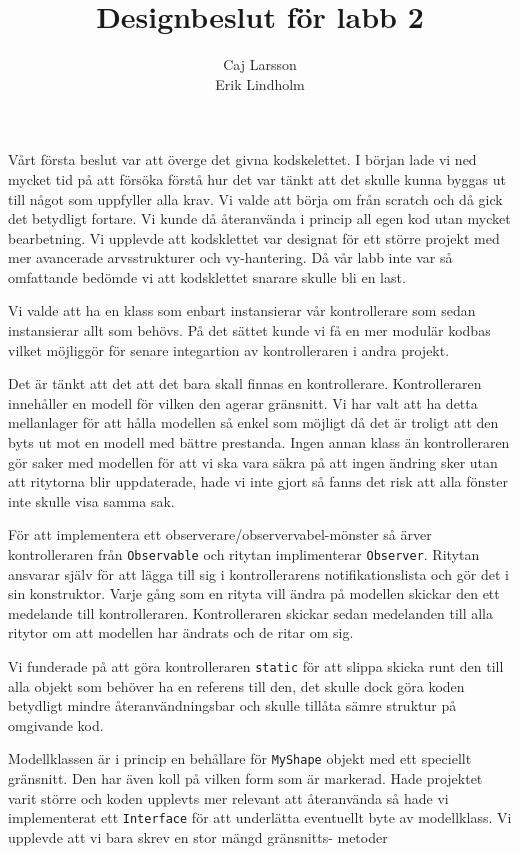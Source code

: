 \documentclass[a4paper,8pt]{article}
\begin{document}
\title{Designbeslut för labb 2}
\author{Caj Larsson\\Erik Lindholm}\maketitle

Vårt första beslut var att överge det givna kodskelettet. I början lade vi ned
mycket tid på att försöka förstå hur det var tänkt att det skulle kunna byggas
ut till något som uppfyller alla krav. Vi valde att börja om från scratch och då
gick det betydligt fortare. Vi kunde då återanvända i princip all egen kod 
utan mycket bearbetning. Vi upplevde att kodsklettet  var designat för ett 
större projekt med mer avancerade arvsstrukturer och vy-hantering. Då vår labb 
inte var så omfattande bedömde vi att kodsklettet snarare skulle bli en last.

Vi valde att ha en klass som enbart instansierar vår kontrollerare som sedan
instansierar allt som behövs. På det sättet kunde vi få en mer modulär kodbas
vilket möjliggör för senare integartion av kontrolleraren i andra projekt.

Det är tänkt att det att det bara skall finnas en kontrollerare. Kontrolleraren
innehåller en modell för vilken den agerar gränsnitt. Vi har valt att ha detta
mellanlager för att hålla modellen så enkel som möjligt då det är troligt att den
byts ut mot en modell med bättre prestanda. Ingen annan klass än kontrolleraren
gör saker med modellen för att vi ska vara säkra på att ingen ändring sker utan
att ritytorna blir uppdaterade, hade vi inte gjort så fanns det risk att alla
fönster inte skulle visa samma sak. 

För att implementera ett observerare/observervabel-mönster så ärver kontrolleraren
från \texttt{Observable} och ritytan implimenterar \texttt{Observer}. Ritytan
ansvarar själv för att lägga till sig i kontrollerarens notifikationslista och
gör det i sin konstruktor. Varje gång som en rityta vill ändra på modellen
skickar den ett medelande till kontrolleraren. Kontrolleraren skickar sedan 
medelanden till alla ritytor om att modellen har ändrats och de ritar om sig. 

Vi funderade på att göra kontrolleraren \texttt{static} för att slippa skicka
runt den till alla objekt som behöver ha en referens till den, det skulle dock
göra koden betydligt mindre återanvändningsbar och skulle tillåta sämre struktur
på omgivande kod.

Modellklassen är i princip en behållare för \texttt{MyShape} objekt med ett
speciellt gränsnitt. Den har även koll på vilken form som är markerad. Hade 
projektet varit större och koden upplevts mer relevant att återanvända så
hade vi implementerat ett \texttt{Interface} för att underlätta eventuellt
byte av modellklass. Vi upplevde att vi bara skrev en stor mängd gränsnitts- 
metoder
\end{document}
